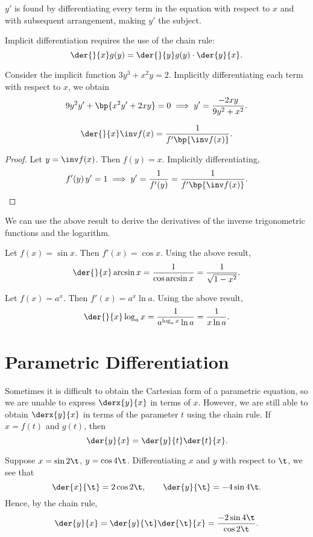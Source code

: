 \begin{recipe}
    $y'$ is found by differentiating every term in the equation with respect to $x$ and with subsequent arrangement, making $y'$ the subject.
\end{recipe}

Implicit differentiation requires the use of the chain rule: \[\der{}{x} g(y) = \der{}{y} g(y) \cdot \der{y}{x}.\]

\begin{example}
    Consider the implicit function $3y^3 + x^2 y = 2$. Implicitly differentiating each term with respect to $x$, we obtain \[9y^2 y' + \bp{x^2 y' + 2x y} = 0 \implies y' = \frac{-2xy}{9y^2 + x^2}.\]
\end{example}

\begin{proposition}
    \[\der{}{x} \inv f(x) = \frac1{{f'\bp{\inv f(x)}}}.\]
\end{proposition}
\begin{proof}
    Let $y = \inv f(x)$. Then $f(y) = x$. Implicitly differentiating, \[f'(y) \, y' = 1 \implies y' = \frac1{f'(y)} = \frac1{{f'\bp{\inv f(x)}}}.\]
\end{proof}

We can use the above result to derive the derivatives of the inverse trigonometric functions and the logarithm.

\begin{example}
    Let $f(x) = \sin x$. Then $f'(x) = \cos x$. Using the above result, \[\der{}{x} \arcsin x = \frac{1}{\cos{\arcsin x}} = \frac1{\sqrt{1 - x^2}}.\]
\end{example}

\begin{example}
    Let $f(x) = a^x$. Then $f'(x) = a^x \ln a$. Using the above result, \[\der{}{x} \log_a x = \frac1{a^{\log_a x} \ln a} = \frac1{x \ln a}.\]
\end{example}

\section{Parametric Differentiation}

Sometimes it is difficult to obtain the Cartesian form of a parametric equation, so we are unable to express $\derx{y}{x}$ in terms of $x$. However, we are still able to obtain $\derx{y}{x}$ in terms of the parameter $t$ using the chain rule. If $x = f(t)$ and $g(t)$, then \[\der{y}{x} = \der{y}{t} \der{t}{x}.\]

\begin{example}
    Suppose $x = \sin 2\t$, $y = \cos 4\t$. Differentiating $x$ and $y$ with respect to $\t$, we see that \[\der{x}{\t} = 2\cos 2\t, \qquad \der{y}{\t} = -4\sin 4\t.\] Hence, by the chain rule, \[\der{y}{x} = \der{y}{\t} \der{\t}{x} = \frac{-2 \sin 4\t}{\cos 2\t}.\]
\end{example}